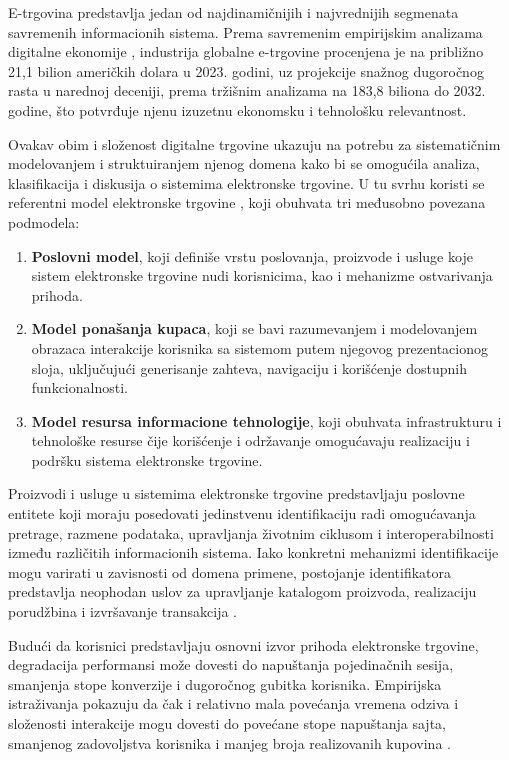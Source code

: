 E-trgovina predstavlja jedan od najdinamičnijih i najvrednijih segmenata savremenih informacionih sistema. Prema savremenim empirijskim analizama digitalne ekonomije \cite{veenam2024cross}, industrija globalne e-trgovine procenjena je na približno 21,1 bilion američkih dolara u 2023. godini, uz projekcije snažnog dugoročnog rasta u narednoj deceniji, prema tržišnim analizama na 183,8 biliona do 2032. godine, što potvrđuje njenu izuzetnu ekonomsku i tehnološku relevantnost.

Ovakav obim i složenost digitalne trgovine ukazuju na potrebu za sistematičnim modelovanjem i struktuiranjem njenog domena kako bi se omogućila analiza, klasifikacija i diskusija o sistemima elektronske trgovine. U tu svrhu koristi se referentni model elektronske trgovine \cite{menasce2000reference}, koji obuhvata tri međusobno povezana podmodela:
\begin{enumerate}
\item \textbf{Poslovni model}, koji definiše vrstu poslovanja, proizvode i usluge koje sistem elektronske trgovine nudi korisnicima, kao i mehanizme ostvarivanja prihoda.
\item \textbf{Model ponašanja kupaca}, koji se bavi razumevanjem i modelovanjem obrazaca interakcije korisnika sa sistemom putem njegovog prezentacionog sloja, uključujući generisanje zahteva, navigaciju i korišćenje dostupnih funkcionalnosti.
\item \textbf{Model resursa informacione tehnologije}, koji obuhvata infrastrukturu i tehnološke resurse čije korišćenje i održavanje omogućavaju realizaciju i podršku sistema elektronske trgovine.
\end{enumerate}

Proizvodi i usluge u sistemima elektronske trgovine predstavljaju poslovne entitete koji moraju posedovati jedinstvenu identifikaciju radi omogućavanja pretrage, razmene podataka, upravljanja životnim ciklusom i interoperabilnosti između različitih informacionih sistema. Iako konkretni mehanizmi identifikacije mogu varirati u zavisnosti od domena primene, postojanje identifikatora predstavlja neophodan uslov za upravljanje katalogom proizvoda, realizaciju porudžbina i izvršavanje transakcija \cite{talaika2015harvesting}.

Budući da korisnici predstavljaju osnovni izvor prihoda elektronske trgovine, degradacija performansi može dovesti do napuštanja pojedinačnih sesija, smanjenja stope konverzije i dugoročnog gubitka korisnika. Empirijska istraživanja pokazuju da čak i relativno mala povećanja vremena odziva i složenosti interakcije mogu dovesti do povećane stope napuštanja sajta, smanjenog zadovoljstva korisnika i manjeg broja realizovanih kupovina \cite{albarq2021effect, arapakis2021impact}.

